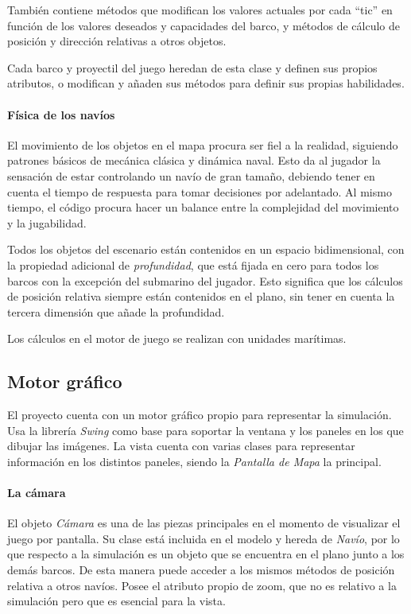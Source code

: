 \documentclass[a4paper,
	11pt,
	parskip=full,
	bibliography=totoc,
	twoside
	]{scrartcl}
\begin{document}
			También contiene métodos que modifican los valores actuales por cada ``tic'' en función de los valores deseados y capacidades del barco, y métodos de cálculo de posición y dirección relativas a otros objetos.
			
			Cada barco y proyectil del juego heredan de esta clase y definen sus propios atributos, o modifican y añaden sus métodos para definir sus propias habilidades.
			
		\paragraph{Física de los navíos}
			El movimiento de los objetos en el mapa procura ser fiel a la realidad, siguiendo patrones básicos de mecánica clásica y dinámica naval. Esto da al jugador la sensación de estar controlando un navío de gran tamaño, debiendo tener en cuenta el tiempo de respuesta para tomar decisiones por adelantado. Al mismo tiempo, el código procura hacer un balance entre la complejidad del movimiento y la jugabilidad.
			
			Todos los objetos del escenario están contenidos en un espacio bidimensional, con la propiedad adicional de \textit{profundidad}, que está fijada en cero para todos los barcos con la excepción del submarino del jugador. Esto significa que los cálculos de posición relativa siempre están contenidos en el plano, sin tener en cuenta la tercera dimensión que añade la profundidad.
			
			Los cálculos en el motor de juego se realizan con unidades marítimas.
	
	\subsection{Motor gráfico}
	\label{subsec:motor_grafico}
		El proyecto cuenta con un motor gráfico propio para representar la simulación. Usa la librería \textit{Swing} como base para soportar la ventana y los paneles en los que dibujar las imágenes. La vista cuenta con varias clases para representar información en los distintos paneles, siendo la \textit{Pantalla de Mapa} la principal.
		
		\paragraph{La cámara}
			El objeto \textit{Cámara} es una de las piezas principales en el momento de visualizar el juego por pantalla. Su clase está incluida en el modelo y hereda de \textit{Navío}, por lo que respecto a la simulación es un objeto que se encuentra en el plano junto a los demás barcos. De esta manera puede acceder a los mismos métodos de posición relativa a otros navíos. Posee el atributo propio de zoom, que no es relativo a la simulación pero que es esencial para la vista.
			
\end{document}

